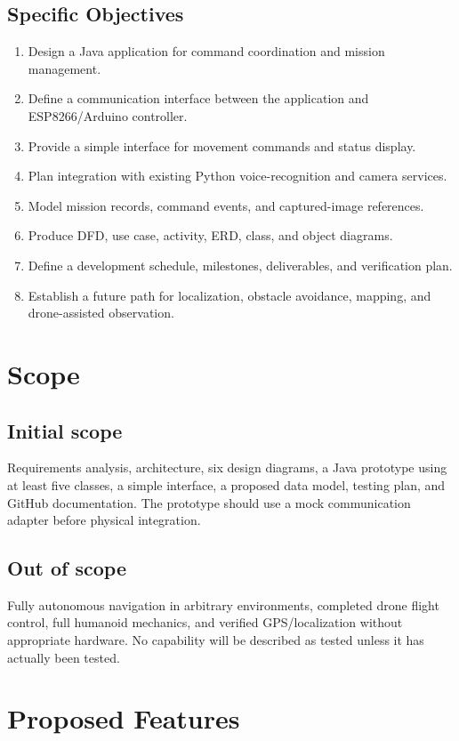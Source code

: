 \documentclass[12pt,a4paper]{article}
\begin{document}
\subsection{Specific Objectives}
\begin{enumerate}
\item Design a Java application for command coordination and mission management.
\item Define a communication interface between the application and ESP8266/Arduino controller.
\item Provide a simple interface for movement commands and status display.
\item Plan integration with existing Python voice-recognition and camera services.
\item Model mission records, command events, and captured-image references.
\item Produce DFD, use case, activity, ERD, class, and object diagrams.
\item Define a development schedule, milestones, deliverables, and verification plan.
\item Establish a future path for localization, obstacle avoidance, mapping, and drone-assisted observation.
\end{enumerate}

\section{Scope}
\subsection{Initial scope}
Requirements analysis, architecture, six design diagrams, a Java prototype using at least five classes, a simple interface, a proposed data model, testing plan, and GitHub documentation. The prototype should use a mock communication adapter before physical integration.
\subsection{Out of scope}
Fully autonomous navigation in arbitrary environments, completed drone flight control, full humanoid mechanics, and verified GPS/localization without appropriate hardware. No capability will be described as tested unless it has actually been tested.

\section{Proposed Features}
\end{document}

